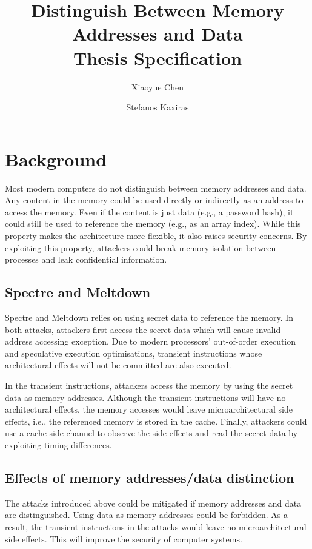 \documentclass[a4paper]{article}
\title{Distinguish Between Memory Addresses and Data\\Thesis Specification}
\author{Xiaoyue Chen \and Stefanos Kaxiras}
\begin{document}
\maketitle

\section{Background}
Most modern computers do not distinguish between memory addresses and
data. Any content in the memory could be used directly or indirectly
as an address to access the memory. Even if the content is just data
(e.g., a password hash), it could still be used to reference the
memory (e.g., as an array index). While this property makes the
architecture more flexible, it also raises security concerns. By
exploiting this property, attackers could break memory isolation
between processes and leak confidential information.

\subsection{Spectre and Meltdown}
Spectre \cite{kocher2019spectre} and Meltdown \cite{lipp2018meltdown}
relies on using secret data to reference the memory. In both attacks,
attackers first access the secret data which will cause invalid
address accessing exception. Due to modern processors' out-of-order
execution and speculative execution optimisations, transient
instructions whose architectural effects will not be committed are
also executed.

In the transient instructions, attackers access the memory by using
the secret data as memory addresses. Although the transient
instructions will have no architectural effects, the memory accesses
would leave microarchitectural side effects, i.e., the referenced
memory is stored in the cache. Finally, attackers could use a cache
side channel to observe the side effects and read the secret data by
exploiting timing differences.

\subsection{Effects of memory addresses/data distinction}
The attacks introduced above could be mitigated if memory addresses
and data are distinguished. Using data as memory addresses could be
forbidden. As a result, the transient instructions in the attacks
would leave no microarchitectural side effects. This will improve the
security of computer systems.
\end{document}
